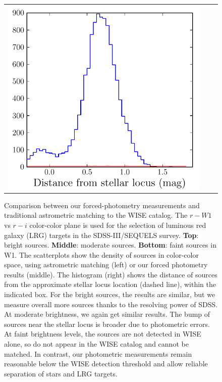 \documentclass[12pt,preprint]{aastex}
\begin{document}
\begin{figure}
\begin{center}
\begin{tabular}{@{}rcc@{}}
    \includegraphics[height=0.23\textheight]{lrg-05}
  \end{tabular}
\end{center}
\caption{Comparison between our forced-photometry measurements and
  traditional astrometric matching to the WISE catalog.  The $r - W1$
  vs $r - i$ color-color plane is used for the selection of luminous
  red galaxy (LRG) targets in the SDSS-III/SEQUELS survey.
  \textbf{Top}: bright sources.  \textbf{Middle}: moderate sources.
  \textbf{Bottom}: faint sources in W1.  The scatterplots show the
  density of sources in color-color space, using astrometric matching
  (left) or our forced photometry results (middle).  The histogram
  (right) shows the distance of sources from the approximate stellar
  locus location (dashed line), within the indicated box.  For the
  bright sources, the results are similar, but we measure overall more
  sources thanks to the resolving power of SDSS.  At moderate
  brightness, we again get similar results.  The bump of sources near
  the stellar locus is broader due to photometric errors.  At faint
  brightness levels, the sources are not detected in WISE alone, so do
  not appear in the WISE catalog and cannot be matched.  In contrast,
  our photometric measurements remain reasonable below the WISE
  detection threshold and allow reliable separation of stars and LRG
  targets.
\label{fig:lrg}}
\end{figure}
\end{document}
